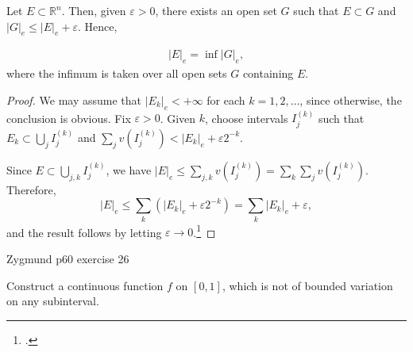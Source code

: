 \documentclass[UTF8,a4paper,10pt]{article}
\begin{document}
\begin{mybox}{}

  \setcounter{section}{3} 
  \setcounter{theorem}{5}
  
  \begin{theorem}\label{thm:3.6}
    Let $E \subset \mathbb{R}^n$. Then, given $\varepsilon > 0$, there exists an open set $G$ such that
    $E \subset G$ and $|G|_e \leq |E|_e + \varepsilon$. Hence,

    \begin{equation}
      \tag{3.7}
      \begin{aligned}
        |E|_e = \inf |G|_e,
      \end{aligned}
    \end{equation}
    where the infimum is taken over all open sets $G$ containing $E$.
    
    \end{theorem}
    
    \begin{proof}
    We may assume that $|E_k|_e < +\infty$ for each $k = 1, 2, \ldots$, since otherwise, the conclusion is obvious. Fix $\varepsilon > 0$. Given $k$, choose intervals $I^{(k)}_j$ such that $E_k \subset \bigcup_j I^{(k)}_j$ and $\sum_j v(I^{(k)}_j) < |E_k|_e + \varepsilon 2^{-k}$.
    
    Since $E \subset \bigcup_{j,k} I^{(k)}_j$, we have $|E|_e \leq \sum_{j,k} v(I^{(k)}_j) = \sum_k \sum_j v(I^{(k)}_j)$. Therefore,
    \[|E|_e \leq \sum_k (|E_k|_e + \varepsilon 2^{-k}) = \sum_k |E_k|_e + \varepsilon,\]
    and the result follows by letting $\varepsilon \to 0$.\footcite[][42]{Wheeden_Zygmund_2015}
    \end{proof}
     

\end{mybox}

\pagebreak


\begin{Problem}[]{Zygmund p60 exercise 26}  

  Construct a continuous function \(f\) on \([0, 1]\), which is not of bounded variation on any subinterval. 

\end{Problem}
\end{document}

